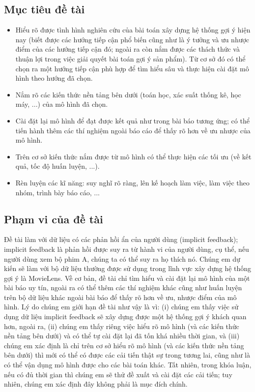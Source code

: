 \documentclass{article}[14pt]
\begin{document}
{      \subsection{Mục tiêu đề tài}
      
      \begin{itemize}
        \item     Hiểu rõ được tình hình nghiên cứu của bài toán xây dựng hệ thống gợi ý
         hiện nay (biết được các hướng tiếp cận phổ biến cũng như là ý tưởng 
         và ưu nhược điểm của các hướng tiếp cận đó; ngoài ra còn nắm được các 
         thách thức và thuận lợi trong việc giải quyết bài toán gợi ý sản phẩm). Từ cơ 
         sở đó có thể chọn ra một hướng tiếp cận phù hợp để tìm hiểu sâu và thực hiện 
         cài đặt mô hình theo hướng đã chọn.
        \item      Nắm rõ các kiến thức nền tảng bên dưới (toán học, xác suất thống kê, 
        học máy, ...) của mô hình đã chọn.
        \item     Cài đặt lại mô hình  để đạt được kết quả như trong bài báo tương ứng; 
        có thể tiến hành thêm các thí nghiệm ngoài báo cáo để thấy rõ hơn về ưu nhược 
        của mô hình.
        \item     Trên cơ sở kiến thức nắm được từ mô hình có thể thực hiện các tối ưu 
        (về kết quả, tốc độ huấn luyện, ...).
        \item     Rèn luyện các kĩ năng: suy nghĩ rõ ràng, lên kế hoạch làm việc, 
        làm việc theo nhóm, trình bày báo cáo, ...
        \end{itemize}

    
    \subsection{Phạm vi của đề tài}
    
    Đề tài làm với dữ liệu có các phản hồi ẩn của người dùng (implicit feedback);
     implicit feedback là phản hồi được suy ra từ hành vi của người dùng, 
    cụ thể, nếu người dùng xem bộ phim A, chúng ta có thể suy ra họ thích nó. 
    Chúng em dự kiến sẽ làm với bộ dữ liệu thường được sử 
    dụng trong lĩnh vực xây dựng  hệ thống gợi ý là MovieLens. 
    Về cơ bản, đề tài chỉ tìm hiểu và cài đặt lại mô hình của một bài báo uy 
tín, ngoài ra có thể thêm các thí nghiệm khác cũng như huấn luyện trên 
bộ dữ liệu khác ngoài bài báo để thấy rõ hơn về ưu, nhược điểm của mô 
hình.
    Lý do chúng em giới hạn đề tài như vậy là vì: (i) chúng em thấy việc sử dụng 
    dữ liệu implicit feedback sẽ xây dựng được một hệ thống gợi ý khách quan hơn, 
     ngoài ra, (ii) chúng em thấy riêng 
việc hiểu rõ mô hình (và các kiến thức nền tảng bên dưới) và có thể tự 
cài đặt lại đã tốn khá nhiều thời gian, và (iii) chúng em xác định là chỉ 
trên cơ sở hiểu rõ mô hình (và các kiến thức nền tảng bên dưới) thì mới 
có thể có được các cải tiến thật sự trong tương lai, cũng như là có thể 
vận dụng mô hình được cho các bài toán khác.
    Tất nhiên, trong khóa luận, nếu có đủ thời gian thì chúng em sẽ thử đề 
xuất và cài đặt các cải tiến; tuy nhiên, chúng em xác định đây không 
phải là mục đích chính.
    
}
\end{document}
